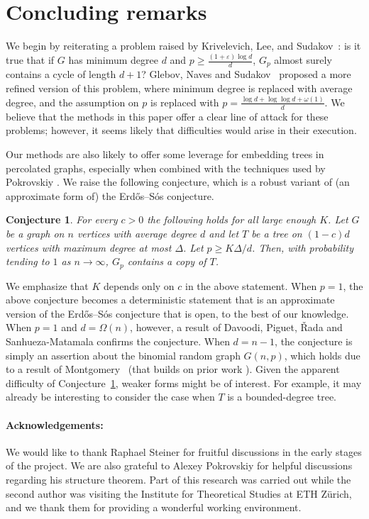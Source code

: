 \documentclass[10pt]{article}
\newtheorem{conjecture}[theorem]{Conjecture}
\theoremstyle{definition}
\newcommand\eps{\varepsilon}
\let\geq\geqslant
\begin{document}
\section{Concluding remarks}\label{sec: concluding}

We begin by reiterating a problem raised by Krivelevich, Lee, and Sudakov~\cite{MR3302900}: is it true that if $G$ has minimum degree $d$ and $p\geq \frac{(1+\eps)\log d }{d}$, $G_p$ almost surely contains a cycle of length $d+1$? Glebov, Naves and Sudakov~\cite{glebov2017threshold} proposed a more refined version of this problem, where minimum degree is replaced with average degree, and the assumption on $p$ is replaced with $p=\frac{\log d+\log\log d+\omega(1)}{d}$. We believe that the methods in this paper offer a clear line of attack for these problems; however, it seems likely that difficulties would arise in their execution. 

Our methods are also likely to offer some leverage for embedding trees in percolated graphs, especially when combined with the techniques used by Pokrovskiy \cite{alexey}. We raise the following conjecture, which is a robust variant of (an approximate form of) the Erd\H os--S\' os conjecture.

\begin{conjecture}\label{conj: robus erdos sos alt}
    For every $c>0$ the following holds for all large enough $K$. Let $G$ be a graph on $n$ vertices with average degree $d$ and let $T$ be a tree on $(1-c)d$ vertices with maximum degree at most $\Delta$. Let $p\geq K \Delta /d$. Then, with probability tending to $1$ as $n\rightarrow\infty$, $G_p$ contains a copy of $T$.
\end{conjecture} We emphasize that $K$ depends only on $c$ in the above statement. When $p=1$, the above conjecture becomes a deterministic statement that is an approximate version of the Erd\H os--S\' os conjecture that is open, to the best of our knowledge. When $p=1$ and $d=\Omega(n)$, however, a result of Davoodi, Piguet, \v{R}ada and Sanhueza-Matamala \cite{davoodi2026asymptotic} confirms the conjecture. When $d=n-1$, the conjecture is simply an assertion about the binomial random graph $G(n,p)$, which holds due to a result of Montgomery~\cite[Theorem 1.4]{montgomery2014sharp} (that builds on prior work \cite{balogh2010large, alon2007embedding}). Given the apparent difficulty of Conjecture~\ref{conj: robus erdos sos alt}, weaker forms might be of interest. For example, it may already be interesting to consider the case when $T$ is a bounded-degree tree. 
 \paragraph{Acknowledgements:}We would like to thank Raphael Steiner for fruitful discussions in the early stages of the project. We are also grateful to Alexey Pokrovskiy for helpful discussions regarding his structure theorem. Part of this research was carried out while the second author was visiting the Institute for Theoretical Studies at ETH Z\"urich, and we thank them for providing a wonderful working environment.
\end{document}
